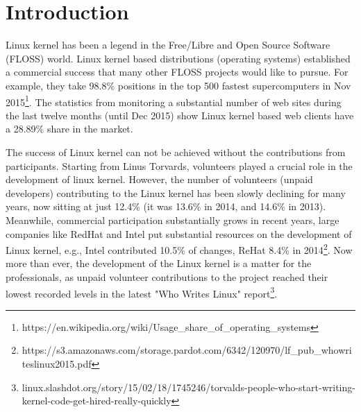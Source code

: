 \documentclass{sig-alternate-05-2015}
\begin{document}
\section{Introduction}

% 

Linux kernel has been a legend in the Free/Libre and Open Source Software (FLOSS) world.
Linux kernel based distributions (operating systems) established a commercial success
that many other FLOSS projects would like to pursue.
For example, they take 98.8\% positions in the top 500 fastest supercomputers 
in Nov 2015\footnote{https://en.wikipedia.org/wiki/Usage\_share\_of\_operating\_systems}.
The statistics from monitoring a substantial number of web sites during the 
last twelve months (until Dec 2015) show Linux kernel based
web clients have a 28.89\% share in the market.

The success of Linux kernel can not be achieved without the contributions
from participants. Starting from Linus Torvards,  volunteers
played a crucial role in the development of linux kernel. 
However, the number of volunteers (unpaid developers) contributing to the 
Linux kernel has been slowly declining for many years, now sitting at just 
 12.4\% (it was 13.6\% in 2014, and 14.6\% in 2013).
Meanwhile, commercial participation substantially grows in recent years,
large companies like RedHat and Intel put substantial resources on the development
of Linux kernel, e.g., Intel contributed 10.5\% of changes, ReHat 8.4\% 
in 2014\footnote{https://s3.amazonaws.com/storage.pardot.com/6342/120970/lf\_pub\_whowriteslinux2015.pdf}.
Now more than ever, the development of the Linux kernel is a matter for 
the professionals, as unpaid volunteer contributions to the project reached their 
lowest recorded levels in the latest "Who Writes Linux" 
report\footnote{linux.slashdot.org/story/15/02/18/1745246/torvalds-people-who-start-writing-kernel-code-get-hired-really-quickly}.

\end{document}

